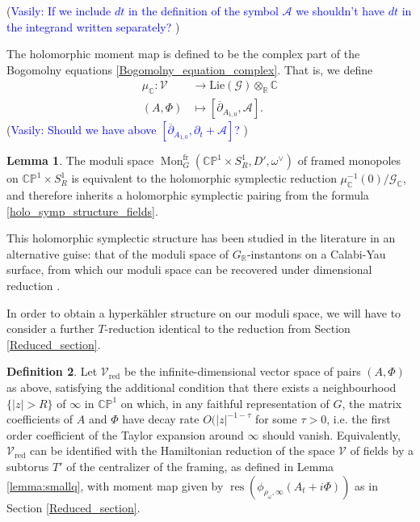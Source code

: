 \documentclass[11pt, oneside, reqno]{amsart}
\theoremstyle{definition} \newtheorem{definition}{Definition}[section]
\newtheorem{lemma}[definition]{Lemma}
\theoremstyle{definition} \newtheorem{remark}[definition]{Remark}
\theoremstyle{definition} \newtheorem{remarks}[definition]{Remarks}
\theoremstyle{definition} \newtheorem{question}[definition]{Question}
\theoremstyle{definition} \newtheorem*{note}{Note}
\theoremstyle{definition} \newtheorem{example}[definition]{Example}
\theoremstyle{definition} \newtheorem{examples}[definition]{Examples}
\newcommand{\bb}[1]{\mathbb{#1}}
\newcommand{\mr}[1]{\mathrm{#1}}
\newcommand{\mc}[1]{\mathcal{#1}}
\newcommand{\del}{\partial}
\newcommand{\ol}[1]{\overline{#1}}
\newcommand{\CC}{\mathbb{C}}
\newcommand{\RR}{\mathbb{R}}
\DeclareMathOperator{\res}{res}
\DeclareMathOperator{\mon}{Mon}
\newcommand{\fr}{\mathrm{fr}}
\newcommand{\vasily}[1]{(\textcolor{blue}{Vasily: #1})}
\begin{document}
\vasily{If we include $dt$ in the definition of the symbol $\mathcal{A}$ we
  shouldn't have $dt$ in the integrand written separately? } 
  


The holomorphic moment map is defined to be the complex part of the Bogomolny equations \ref{Bogomolny_equation_complex}.  That is, we define
\begin{align*}
\mu_\CC \colon \mc V &\to \mr{Lie}(\mc G) \otimes_\RR \CC \\
(A,\Phi) &\mapsto [\ol{\del}_{A_{1,0}}, \mc A].
\end{align*}
\vasily{Should we have above $[\ol{\del}_{A_{1,0}}, \partial_t + \mc A]$? } 
\begin{lemma}
  The moduli space $\mon^\fr_G(\bb{CP}^1 \times S^1_R, D', \omega^\vee)$ of framed monopoles on $\bb{CP}^1 \times S^1_R$ is equivalent to the holomorphic symplectic reduction $\mu_\CC^{-1}(0)/\mc G_\CC$, and therefore inherits a holomorphic symplectic pairing from the formula \ref{holo_symp_structure_fields}. 
\end{lemma}

This holomorphic symplectic structure has been studied in the literature in an alternative guise: that of the moduli space of $G_\RR$-instantons on a Calabi-Yau surface, from which our moduli space can be recovered under dimensional reduction \cite{Mukai1,Mukai2,Bottacin1,Bottacin2, HurtubiseMarkman}.   

In order to obtain a hyperk\"ahler structure on our moduli space, we will have to consider a further $T$-reduction identical to the reduction from Section \ref{Reduced_section}.

\begin{definition}
  Let $\mc V_{\mr{red}}$ be the infinite-dimensional vector space of pairs $(A,\Phi)$ as above, satisfying the additional condition that there exists a neighbourhood $\{|z| > R\}$ of $\infty$ in $\bb{CP}^1$ on which, in any faithful representation of $G$, the matrix coefficients of $A$ and $\Phi$ have decay rate $O(|z|^{-1-\tau}$ for some $\tau > 0$, i.e. the first order coefficient of the Taylor expansion around $\infty$ should vanish. Equivalently, $\mc V_{\mr{red}}$ can be identified with the Hamiltonian reduction of the space $\mc V$ of fields by a subtorus $T'$ of the centralizer of the framing, as defined in Lemma \ref{lemma:smallq}, with moment map given by $\res(\phi_{\rho_\omega, \infty}(A_t + i \Phi))$ as in Section \ref{Reduced_section}.
\end{definition}
\end{document}
